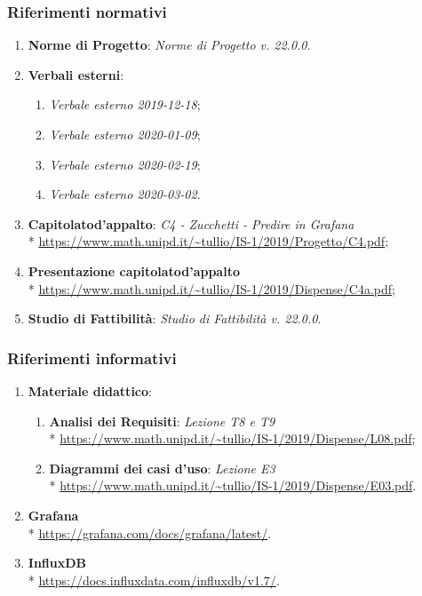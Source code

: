 		\subsubsection{Riferimenti normativi}
			\begin{enumerate}
				\item \textbf{Norme di Progetto}: \textit{Norme di Progetto v. 22.0.0}.
				\item \textbf{Verbali esterni}:
				\begin{enumerate}
					\item \textit{Verbale esterno 2019-12-18};
					\item \textit{Verbale esterno 2020-01-09};
					\item \textit{Verbale esterno 2020-02-19};
					\item \textit{Verbale esterno 2020-03-02}.
				\end{enumerate}
				\item \textbf{Capitolato}\glosp \textbf{d'appalto}: \textit{C4 - Zucchetti - Predire in Grafana}\glo \\*
				\url{https://www.math.unipd.it/~tullio/IS-1/2019/Progetto/C4.pdf};
				\item \textbf{Presentazione capitolato}\glosp \textbf{d'appalto} \\*
				\url{https://www.math.unipd.it/~tullio/IS-1/2019/Dispense/C4a.pdf};
				\item \textbf{Studio di Fattibilità}: \textit{Studio di Fattibilità v. 22.0.0}.
			\end{enumerate}
		\subsubsection{Riferimenti informativi}
			\begin{enumerate}
				\item \textbf{Materiale didattico}:
				\begin{enumerate}
					\item \textbf{Analisi dei Requisiti}: \textit{Lezione T8 e T9} \\*
					\url{https://www.math.unipd.it/~tullio/IS-1/2019/Dispense/L08.pdf};
					\item \textbf{Diagrammi dei casi d'uso}\glo: \textit{Lezione E3} \\*
					\url{https://www.math.unipd.it/~tullio/IS-1/2019/Dispense/E03.pdf}.
				\end{enumerate}
				\item \textbf{Grafana}\glo \\*
					\url{https://grafana.com/docs/grafana/latest/}.
				\item \textbf{InfluxDB} \\*
					\url{https://docs.influxdata.com/influxdb/v1.7/}.
			\end{enumerate}
